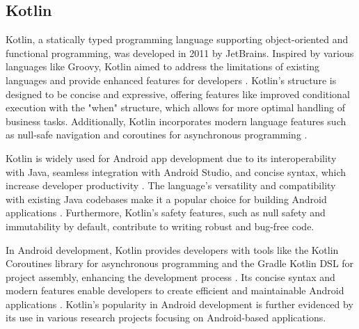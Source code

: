 \subsection{Kotlin}
Kotlin, a statically typed programming language supporting object-oriented and functional programming, was developed in 2011 by JetBrains. Inspired by various languages like Groovy, Kotlin aimed to address the limitations of existing languages and provide enhanced features for developers \cite{king2020history}. Kotlin's structure is designed to be concise and expressive, offering features like improved conditional execution with the "when" structure, which allows for more optimal handling of business tasks. Additionally, Kotlin incorporates modern language features such as null-safe navigation and coroutines for asynchronous programming \cite{li2022mapping}. 
\par
Kotlin is widely used for Android app development due to its interoperability with Java, seamless integration with Android Studio, and concise syntax, which increase developer productivity \cite{li2022mapping}. The language's versatility and compatibility with existing Java codebases make it a popular choice for building Android applications \cite{stepanov2022backend}. Furthermore, Kotlin's safety features, such as null safety and immutability by default, contribute to writing robust and bug-free code.
\par
In Android development, Kotlin provides developers with tools like the Kotlin Coroutines library for asynchronous programming and the Gradle Kotlin DSL for project assembly, enhancing the development process \cite{king2020history}. Its concise syntax and modern features enable developers to create efficient and maintainable Android applications \cite{kartinah2023android}. Kotlin's popularity in Android development is further evidenced by its use in various research projects focusing on Android-based applications. 
